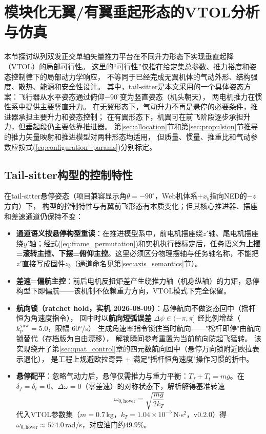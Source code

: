 \section{模块化无翼/有翼垂起形态的VTOL分析与仿真}
\label{sec:vtol}

本节探讨纵列双发正交单轴矢量推力平台在不同升力形态下实现垂直起降（VTOL）的局部可行性。
这里的“可行性”仅指在给定集总参数、推力裕度和姿态控制律下的局部动力学响应，
不等同于已经完成无翼机体的气动外形、结构强度、散热、能源和安全性设计。
其中，tail-sitter是本文采用的一个具体姿态方案：飞行器从水平姿态通过俯仰$-90^\circ$变为竖直姿态（机头朝天），
两电机推力在惯性系中提供主要竖直升力。
在无翼形态下，气动升力不再是悬停的必要条件，推进器承担主要升力和姿态控制；
在有翼形态下，机翼可在前飞阶段逐步承担升力，但垂起段仍主要依靠推进器。
第\ref{sec:allocation}节和第\ref{sec:propulsion}节推导的推力矢量映射和推进模型对两种形态均适用，
但质量、惯量、推重比和气动参数应按式(\ref{eq:configuration_params})分别标定。

\subsection{Tail-sitter构型的控制特性}

在tail-sitter悬停姿态（项目兼容显示角$\theta=-90^\circ$，Web机体系$+x_b$指向NED的$-z$方向）下，
构型的控制特性与有翼前飞形态有本质变化；但其核心推进器、摆座和差速通道仍保持不变：

\begin{itemize}
    \item \textbf{通道语义按悬停构型重读}：在推进模型系中，前电机摆座绕$z'$轴、尾电机摆座绕$y'$轴；经式(\ref{eq:frame_permutation})和实机执行器标定后，任务语义为\textbf{上摆=滚转主控、下摆=俯仰主控}。这里必须区分物理摆轴与任务轴名称，不能把$z'$直接写成固件$z_b$（通道命名见第\ref{sec:axis_semantics}节）。
    \item \textbf{差速=偏航主控}：前后电机反扭矩差产生绕推力轴（机身纵轴）的力矩，悬停构型下即偏航——该机制不依赖重力方向，VTOL模式下完全保留。
\item \textbf{航向锁（ratchet hold，实机 2026-08-09）}：悬停航向不做姿态回中（摇杆恒为角速度指令），
回中时以\textbf{航向短弧误差} $\Delta\psi\in(-\pi,\pi]$ 经比例增益（$k_p^{\text{yaw}}=5.0$，限幅 60°/s）
生成角速率指令锁住当时航向——"松杆即停"由航向锁替代（存档版为自由漂移），
解锁瞬间参考重置为当前航向防起飞猛转。
该实现绕开了第\ref{sec:quat_control}章的四元数航向回中（悬停万向锁附近欧拉表示退化），
是工程上规避欧拉奇异 + 满足"摇杆恒角速度"操作习惯的折中。
    \item \textbf{悬停配平}：忽略气动力后，悬停仅需推力与重力平衡：$T_f+T_t = mg$。在$\delta_f=\delta_t=0$、$\Delta\omega=0$（零差速）的对称状态下，解析解得基准转速
    \begin{equation}
        \omega_{0,\text{hover}} = \sqrt{\frac{mg}{2k_T}}
        \label{eq:hover_omega0}
    \end{equation}
    代入VTOL参数集（$m=0.7$\,kg，$k_T=1.04\times10^{-5}$\,N$\cdot$s$^2$，v0.2.0）得$\omega_{0,\text{hover}} \approx 574.0$\,rad/s，对应油门约$49.9\%$。
\end{itemize}

